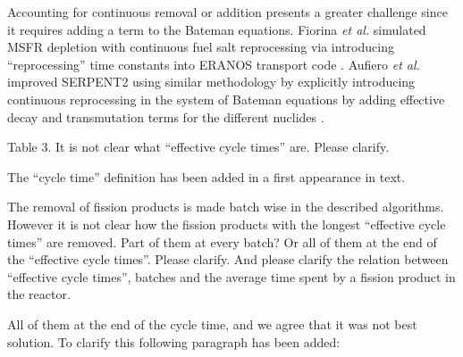 \documentclass[answers,11pt]{exam}
\begin{document}
\begin{questions}
\begin{solution}
                Accounting for continuous removal or addition presents a greater 
                challenge since it requires adding a term to the Bateman equations. 
                Fiorina \emph{et al.} simulated MSFR depletion with continuous
                 fuel salt reprocessing via introducing ``reprocessing'' time 
                constants into ERANOS transport code \cite{fiorina_investigation_2013}. 
                Aufiero \emph{et al.} improved SERPENT2 using similar methodology by 
                explicitly introducing continuous reprocessing in the system of Bateman 
                equations by adding effective decay and transmutation terms for the 
                different nuclides \cite{aufiero_extended_2013}. 
        \end{solution}


        \question Table 3. It is not clear what ``effective cycle times'' are. 
        Please clarify.
        \begin{solution}
                The ``cycle time'' definition has been added in a first appearance in text.
        \end{solution}


        \question The removal of fission products is made batch wise in the 
        described algorithms. However it is not clear how the fission products 
        with the longest ``effective cycle times'' are removed. Part of them at 
        every batch? Or all of them at the end of the  ``effective cycle 
        times''.  Please clarify. And please clarify the relation between 
        ``effective cycle times'', batches and the average time spent by a 
        fission product in the reactor.
        \begin{solution}
                All of them at the end of the cycle time, and we agree that it
                 was not best solution. To clarify this following paragraph has 
                been added:
                 

\end{solution}
\end{questions}
\end{document}
